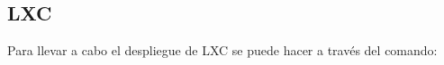 \subsection{\label{sec:despliegue-lxc}LXC}

Para llevar a cabo el despliegue de LXC se puede hacer a través del comando:

